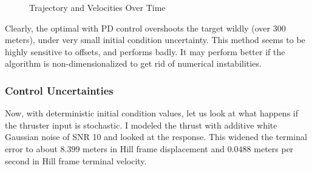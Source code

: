 \documentclass[conf]{new-aiaa}
\begin{document}
\begin{singlespace}
\begin{figure}[htpb!]
\begin{subfigure}{.5\textwidth}
\end{subfigure}
\caption{Trajectory and Velocities Over Time}
\label{fig:uncertain}
\end{figure}

Clearly, the optimal with PD control overshoots the target wildly (over 300 meters), under very small initial condition uncertainty. This method seems to be highly sensitive to offsets, and performs badly. It may perform better if the algorithm is non-dimensionalized to get rid of numerical instabilities.


\subsubsection{Control Uncertainties}
Now, with deterministic initial condition values, let us look at what happens if the thruster input is stochastic. I modeled the thrust with additive white Gaussian noise of SNR 10 and looked at the response. This widened the terminal error to about $8.399$ meters in Hill frame displacement and $0.0488$ meters per second in Hill frame terminal velocity.


\end{singlespace}
\end{document}
